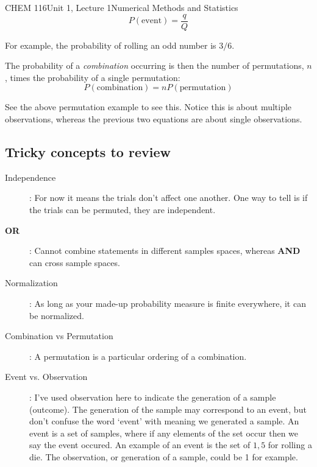 \documentclass{article}
\begin{document}
\begin{tdoc}{CHEM 116}{Unit 1, Lecture 1}{Numerical Methods and Statistics}
\begin{equation}
P(\textrm{event}) = \frac{q}{Q}
\end{equation}

For example, the probability of rolling an odd number is $3 / 6$. 


The probability of a \emph{combination} occurring is then the number of
permutations, $n$, times the probability of a single permutation:
\begin{equation}
P(\textrm{combination}) = n P(\textrm{permutation})
\end{equation}
\vspace{0.2cm}

See the above permutation example to see this. Notice this is about multiple observations, whereas the previous two equations are about single observations.

\subsection{Tricky concepts to review}

\begin{description}

\item [Independence]: For now it means the trials don't affect one
another. One way to tell is if the trials can be permuted, they are
independent.\vspace{0.2cm}\\

\item[{\bf OR}]: Cannot combine statements in different samples spaces, whereas {\bf AND} can cross sample spaces.\vspace{0.2cm}\\

\item[Normalization]: As long as your made-up probability measure is
finite everywhere, it can be normalized.

\item[Combination vs Permutation]: A permutation is a particular
  ordering of a combination. 

\item[Event vs. Observation]: I've used observation here to indicate
  the generation of a sample (outcome). The generation of the sample
  may correspond to an event, but don't confuse the word `event' with
  meaning we generated a sample. An event is a set of samples, where
  if any elements of the set occur then we say the event occured. An
  example of an event is the set of ${1,5}$ for rolling a die. The
  observation, or generation of a sample, could be 1 for example.

\end{description}

\end{tdoc}
\end{document}
